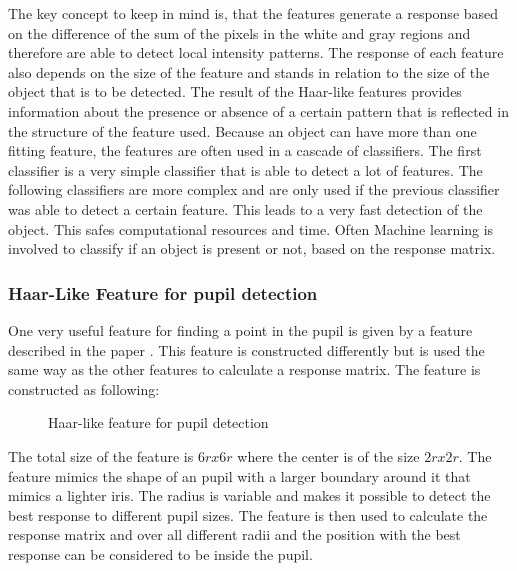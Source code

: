 The key concept to keep in mind is, that the features generate a response based on the difference of the sum of the pixels in the white and gray regions and therefore are able to detect local intensity patterns. The response of each feature also depends on the size of the feature and stands in relation to the size of the object that is to be detected. The result of the Haar-like features provides information about the presence or absence of a certain pattern that is reflected in the structure of the feature used. Because an object can have more than one fitting feature, the features are often used in a cascade of classifiers. The first classifier is a very simple classifier that is able to detect a lot of features. The following classifiers are more complex and are only used if the previous classifier was able to detect a certain feature. This leads to a very fast detection of the object. This safes computational resources and time. Often Machine learning is involved to classify if an object is present or not, based on the response matrix. 

\subsubsection{Haar-Like Feature for pupil detection }
One very useful feature for finding a point in the pupil is given by a feature described in the paper \cite{swirski_robust_2012} . This feature is constructed differently but is used the same way as the other features to calculate a response matrix. The feature is constructed as following: 
\begin{figure}
    \centering
\label{haar_pupil}
\caption{Haar-like feature for pupil detection}
\end{figure}
The total size of the feature is $6rx6r$ where the center is of the size $2rx2r$. The feature mimics the shape of an pupil with a larger boundary around it that mimics a lighter iris. The radius is variable and makes it possible to detect the best response to different pupil sizes. The feature is then used to calculate the response matrix and over all different radii and the position with the best response can be considered to be inside the pupil.

